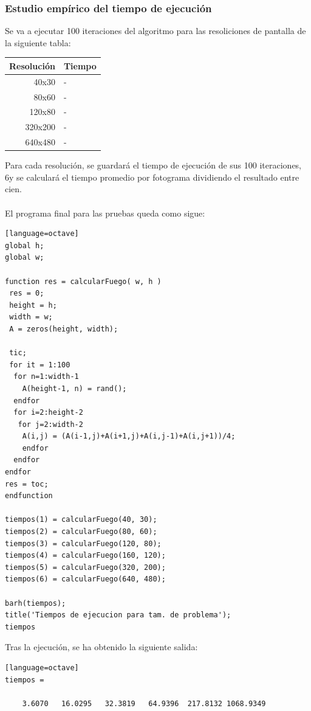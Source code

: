 \documentclass[a4,12pt]{article}
\begin{document}
\subsubsection{Estudio empírico del tiempo de ejecución}

Se va a ejecutar 100 iteraciones del algoritmo para las resoliciones de pantalla de la siguiente tabla:\\
\begin{tabular}{ | r | l |}
\hline
  Resolución & Tiempo \\
\hline
  40x30 & - \\
  80x60 & - \\
  120x80 & - \\
  320x200 & - \\
  640x480 & - \\
\hline
\end{tabular}

Para cada resolución, se guardará el tiempo de ejecución de sus 100 iteraciones, 6y se calculará el tiempo promedio por fotograma dividiendo el resultado entre cien.
\\
\\
El programa final para las pruebas queda como sigue:
\bigskip
\lstset{language=Octave}
\begin{lstlisting}[frame=single][language=octave]
global h;
global w;

function res = calcularFuego( w, h )
 res = 0;
 height = h;
 width = w;
 A = zeros(height, width);

 tic;
 for it = 1:100
  for n=1:width-1
	A(height-1, n) = rand();
  endfor
  for i=2:height-2
   for j=2:width-2
	A(i,j) = (A(i-1,j)+A(i+1,j)+A(i,j-1)+A(i,j+1))/4;
    endfor
  endfor
endfor
res = toc;
endfunction

tiempos(1) = calcularFuego(40, 30);
tiempos(2) = calcularFuego(80, 60);
tiempos(3) = calcularFuego(120, 80);
tiempos(4) = calcularFuego(160, 120);
tiempos(5) = calcularFuego(320, 200);
tiempos(6) = calcularFuego(640, 480);

barh(tiempos);
title('Tiempos de ejecucion para tam. de problema');
tiempos
\end{lstlisting}
\newpage
Tras la ejecución, se ha obtenido la siguiente salida:\\
\lstset{language=Octave}
\begin{lstlisting}[frame=single][language=octave]
tiempos =

    3.6070   16.0295   32.3819   64.9396  217.8132 1068.9349
\end{lstlisting}
\end{document}
